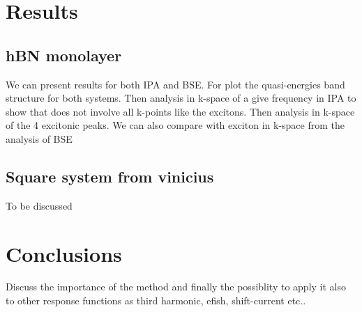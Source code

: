 \documentclass{iopjournal}
\begin{document}
\section{Results}
\subsection{hBN monolayer}
We can present results for both IPA and BSE. 
For plot the quasi-energies band structure for both systems.
Then analysis in k-space of a give frequency in IPA to show that does not
involve all k-points like the excitons.
Then analysis in k-space of the 4 excitonic peaks.
We can also compare with exciton in k-space from the analysis of BSE
\subsection{Square system from vinicius}
To be discussed 
\section{Conclusions}
Discuss the importance of the method and finally the possiblity to apply it also to other response functions as third harmonic\cite{PhysRevB.95.125403}, efish\cite{SciPostPhysCore.7.4.081}, shift-current\cite{qth8-6spb} etc..



\end{document}
